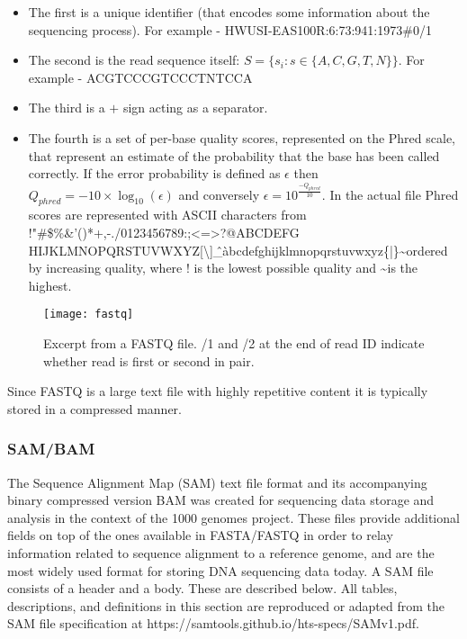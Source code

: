 \begin{itemize}
    \item The first is a unique identifier (that encodes some information about the sequencing process). For example - HWUSI-EAS100R:6:73:941:1973\#0/1
    \item The second is the read sequence itself: $S = \{s_i: s \in\{A,C,G,T,N\}\}$. For example - ACGTCCCGTCCCTNTCCA
    \item The third is a $+$ sign acting as a separator.
    \item The fourth is a set of per-base quality scores, represented on the Phred scale, that represent an estimate of the probability that the base has been called correctly. If the error probability is defined as $\epsilon$ then $Q_{phred} = -10\times\log_{10}(\epsilon)$ and conversely $\epsilon = 10^{\frac{-Q_{phred}}{10}}$. In the actual file Phred scores are represented with ASCII characters from !"\#\$\%\&'()*+,-./0123456789:;<=>?@ABCDEFG HIJKLMNOPQRSTUVWXYZ[\textbackslash]\^\_\`abcdefghijklmnopqrstuvwxyz\{|\}\textasciitilde ordered by increasing quality, where ! is the lowest possible quality and \textasciitilde is the highest.
\end{itemize}

\begin{figure}[H]
    \texttt{[image: fastq]}
    \centering
    \caption {Excerpt from a FASTQ file. /1 and /2 at the end of read ID indicate whether read is first or second in pair.}
    \label{fig:fastq}
\end{figure}

Since FASTQ is a large text file with highly repetitive content it is typically stored in a compressed manner.

\subsubsection{SAM/BAM}
\label{sec:bg_sam_bam}

The Sequence Alignment Map (SAM) text file format and its accompanying binary compressed version BAM was created for sequencing data storage and analysis in the context of the 1000 genomes project\autocite{li2009sequence}. These files provide additional fields on top of the ones available in FASTA/FASTQ in order to relay information related to sequence alignment to a reference genome, and are the most widely used format for storing DNA sequencing data today. A SAM file consists of a header and a body. These are described below. All tables, descriptions, and definitions in this section are reproduced or adapted from the SAM file specification at https://samtools.github.io/hts-specs/SAMv1.pdf.

